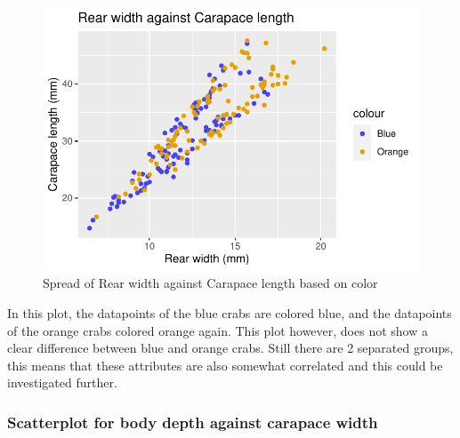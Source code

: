 \documentclass[
]{article}
\begin{document}
\begin{figure}[H]

{\centering \includegraphics{Log_files/figure-latex/figure2-1} 

}

\caption{Spread of Rear width against Carapace length based on color}\label{fig:figure2}
\end{figure}

In this plot, the datapoints of the blue crabs are colored blue, and the
datapoints of the orange crabs colored orange again. This plot however,
does not show a clear difference between blue and orange crabs. Still
there are 2 separated groups, this means that these attributes are also
somewhat correlated and this could be investigated further. \newpage

\hypertarget{scatterplot-for-body-depth-against-carapace-width}{%
\subsubsection{Scatterplot for body depth against carapace
width}\label{scatterplot-for-body-depth-against-carapace-width}}
\end{document}
